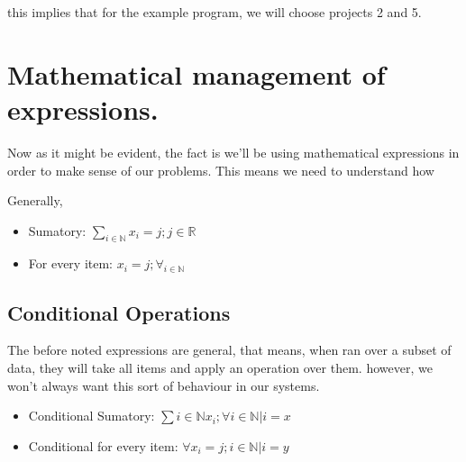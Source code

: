\documentclass{textbook}
\begin{document}

this implies that for the example program, we will choose projects 2 and 5. 

\section{Mathematical management of expressions.}

Now as it might be evident, the fact is we'll be using mathematical expressions 
in order to make sense of our problems. This means we need to understand
how 

Generally, 

\begin{itemize}
    \item Sumatory: $\sum_{i\in \mathbb{N}} x_i = j ; j \in \mathbb{R}$
    \item For every item: $x_i = j ; \forall_{i \in \mathbb{N}}$
\end{itemize}

\subsection{Conditional Operations}

The before noted expressions are general, that means, when ran over a subset of data, they will
take all items and apply an operation over them. however, we won't always want this sort of behaviour in our
systems.

\begin{itemize}
    \item Conditional Sumatory: $\sum{i \in \mathbb{N}} x_i ; \forall i \in \mathbb{N} | i = x$
    \item Conditional for every item: $\forall{x_i = j; i \in \mathbb{N} | i = y}$
\end{itemize}
\end{document}
